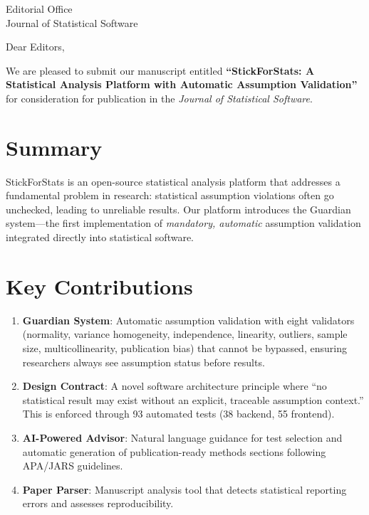 \documentclass[11pt]{letter}
\begin{document}
\begin{letter}{
Editorial Office\\
Journal of Statistical Software\\
}

\opening{Dear Editors,}

We are pleased to submit our manuscript entitled \textbf{``StickForStats: A Statistical Analysis Platform with Automatic Assumption Validation''} for consideration for publication in the \textit{Journal of Statistical Software}.

\section*{Summary}

StickForStats is an open-source statistical analysis platform that addresses a fundamental problem in research: statistical assumption violations often go unchecked, leading to unreliable results. Our platform introduces the Guardian system---the first implementation of \textit{mandatory, automatic} assumption validation integrated directly into statistical software.

\section*{Key Contributions}

\begin{enumerate}
\item \textbf{Guardian System}: Automatic assumption validation with eight validators (normality, variance homogeneity, independence, linearity, outliers, sample size, multicollinearity, publication bias) that cannot be bypassed, ensuring researchers always see assumption status before results.

\item \textbf{Design Contract}: A novel software architecture principle where ``no statistical result may exist without an explicit, traceable assumption context.'' This is enforced through 93 automated tests (38 backend, 55 frontend).

\item \textbf{AI-Powered Advisor}: Natural language guidance for test selection and automatic generation of publication-ready methods sections following APA/JARS guidelines.

\item \textbf{Paper Parser}: Manuscript analysis tool that detects statistical reporting errors and assesses reproducibility.


\end{enumerate}
\end{letter}
\end{document}
